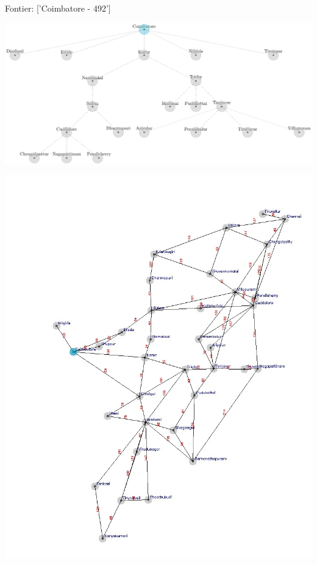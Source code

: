 \documentclass[xcolor=table]{beamer}
\begin{document}
\begin{frame}
  { \tiny Fontier: ['Coimbatore - 492'] }
  \begin{center}
  \includegraphics[height=0.35\textheight]{../AStarNode/2-1.png}
  \end{center}
  \begin{center}
    \includegraphics[height=0.55\textheight]{../AStaroutput/tamilAStar0.jpg}
  \end{center}
\end{frame}
\end{document}
